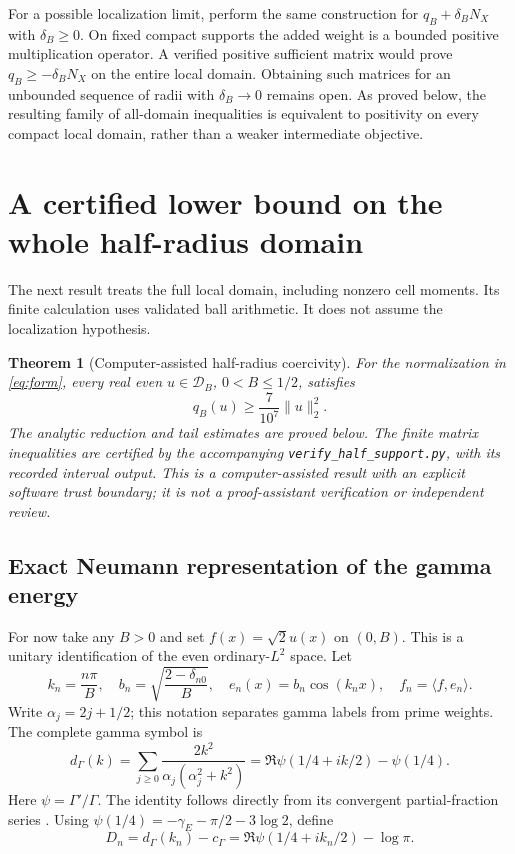 \documentclass[11pt]{article}
\newtheorem{theorem}{Theorem}
\newcommand{\norm}[1]{\lVert#1\rVert}
\begin{document}
For a possible localization limit, perform the same construction for
$q_B+\delta_B N_X$ with $\delta_B\ge0$. On fixed compact supports the
added weight is a bounded positive multiplication operator. A verified
positive sufficient matrix would prove
$q_B\ge-\delta_BN_X$ on the entire local domain. Obtaining such matrices
for an unbounded sequence of radii with $\delta_B\to0$ remains open.
As proved below, the resulting family of all-domain inequalities is
equivalent to positivity on every compact local domain, rather than
a weaker intermediate objective.

\section{A certified lower bound on the whole half-radius domain}
\label{sec:half}
The next result treats the full local domain, including nonzero cell
moments. Its finite calculation uses validated ball arithmetic. It does
not assume the localization hypothesis.

\begin{theorem}[Computer-assisted half-radius coercivity]\label{thm:half}
For the normalization in \eqref{eq:form}, every real even
$u\in\mathcal D_B$, $0<B\le1/2$, satisfies
\begin{equation}\label{eq:halfwin}
 \boxed{q_B(u)\ge\frac7{10^7}\norm u_2^2.}
\end{equation}
The analytic reduction and tail estimates are proved below. The finite
matrix inequalities are certified by the accompanying
\texttt{verify\_half\_support.py}, with its recorded interval output.
This is a computer-assisted result with an explicit software trust
boundary; it is not a proof-assistant verification or independent review.
\end{theorem}

\subsection{Exact Neumann representation of the gamma energy}
For now take any $B>0$ and set $f(x)=\sqrt2u(x)$ on $(0,B)$.
This is a unitary identification of the even ordinary-$L^2$ space.
Let
\[
 k_n=\frac{n\pi}{B},\quad b_n=\sqrt{\frac{2-\delta_{n0}}B},\quad
 e_n(x)=b_n\cos(k_nx),\quad f_n=\langle f,e_n\rangle.
\]
Write $\alpha_j=2j+1/2$; this notation separates gamma labels from
prime weights. The complete gamma symbol is
\begin{equation}\label{eq:exact-symbol}
 d_\Gamma(k)=\sum_{j\ge0}\frac{2k^2}{\alpha_j(\alpha_j^2+k^2)}
 =\Re\psi(1/4+ik/2)-\psi(1/4).
\end{equation}
Here $\psi=\Gamma'/\Gamma$. The identity follows directly from its
convergent partial-fraction series \cite[\S5.7(ii)]{DLMF}.
Using $\psi(1/4)=-\gamma_E-\pi/2-3\log2$, define
\[
 D_n=d_\Gamma(k_n)-c_\Gamma
     =\Re\psi(1/4+ik_n/2)-\log\pi.
\]
\end{document}
